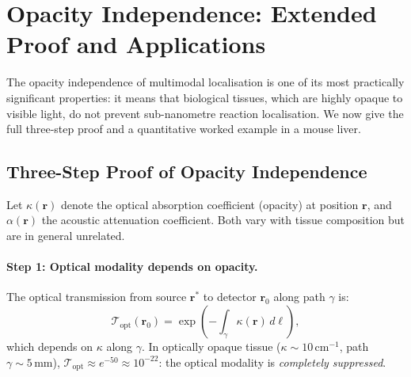 \section{Opacity Independence: Extended Proof and Applications}
\label{sec:ch06-opacity-independence-extended}

The opacity independence of multimodal localisation is one of its most
practically significant properties: it means that biological tissues, which
are highly opaque to visible light, do not prevent sub-nanometre reaction
localisation.  We now give the full three-step proof and a quantitative
worked example in a mouse liver.

\subsection{Three-Step Proof of Opacity Independence}
\label{sec:ch06-opacity-proof}

Let $\kappa(\mathbf{r})$ denote the optical absorption coefficient (opacity)
at position $\mathbf{r}$, and $\alpha(\mathbf{r})$ the acoustic attenuation
coefficient.  Both vary with tissue composition but are in general unrelated.

\paragraph{Step 1: Optical modality depends on opacity.}
The optical transmission from source $\mathbf{r}^*$ to detector $\mathbf{r}_0$
along path $\gamma$ is:
\begin{equation}
  \mathcal{T}_\text{opt}(\mathbf{r}_0)
  = \exp\!\left(-\int_\gamma \kappa(\mathbf{r})\,d\ell\right),
  \label{eq:ch06-optical-transmission}
\end{equation}
which depends on $\kappa$ along $\gamma$.  In optically opaque tissue
($\kappa \sim 10\,\text{cm}^{-1}$, path $\gamma \sim 5\,\text{mm}$),
$\mathcal{T}_\text{opt} \approx e^{-50} \approx 10^{-22}$: the optical
modality is \emph{completely suppressed}.

